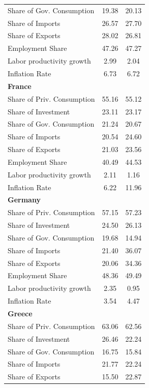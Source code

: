 \documentclass[12pt]{article}
\begin{document}
\begin{appendices}
\begin{center}
\begin{longtable}{lcc}
Share of Gov. Consumption &     19.38 &     20.13 \\  
Share of Imports &     26.57 &     27.70 \\  
Share of Exports &     28.02 &     26.81 \\  
Employment Share &     47.26 &     47.27 \\  
Labor productivity growth &      2.99 &      2.04 \\  
Inflation Rate &      6.73 &      6.72 \\    \hline
\textbf{France} &  &  \\  
Share of Priv. Consumption &     55.16 &     55.12 \\  
Share of Investment &     23.11 &     23.17 \\  
Share of Gov. Consumption &     21.24 &     20.67 \\  
Share of Imports &     20.54 &     24.60 \\  
Share of Exports &     21.03 &     23.56 \\  
Employment Share &     40.49 &     44.53 \\  
Labor productivity growth &      2.11 &      1.16 \\  
Inflation Rate &      6.22 &     11.96 \\   \hline
\textbf{Germany} &  &  \\  
Share of Priv. Consumption &     57.15 &     57.23 \\  
Share of Investment &     24.50 &     26.13 \\  
Share of Gov. Consumption &     19.68 &     14.94 \\  
Share of Imports &     21.40 &     36.07 \\  
Share of Exports &     20.06 &     34.36 \\  
Employment Share &     48.36 &     49.49 \\  
Labor productivity growth &      2.35 &      0.95 \\  
Inflation Rate &      3.54 &      4.47 \\  \hline
\textbf{Greece} &  &  \\  
Share of Priv. Consumption &     63.06 &     62.56 \\  
Share of Investment &     26.46 &     22.24 \\  
Share of Gov. Consumption &     16.75 &     15.84 \\  
Share of Imports &     21.77 &     22.24 \\  
Share of Exports &     15.50 &     22.87 \\  

\end{longtable}
\end{center}
\end{appendices}
\end{document}
